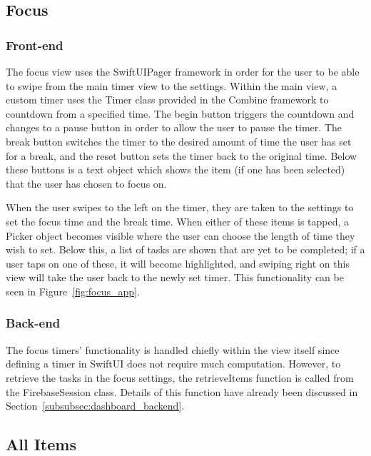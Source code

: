         \subsection{Focus}
        \subsubsection{Front-end}
        The focus view uses the SwiftUIPager framework in order for the user to be able to swipe from the main timer view to the settings.  Within the main view, a custom timer uses the Timer class provided in the Combine framework to countdown from a specified time.  The begin button triggers the countdown and changes to a pause button in order to allow the user to pause the timer.  The break button switches the timer to the desired amount of time the user has set for a break, and the reset button sets the timer back to the original time.  Below these buttons is a text object which shows the item (if one has been selected) that the user has chosen to focus on.
        
        When the user swipes to the left on the timer, they are taken to the settings to set the focus time and the break time.  When either of these items is tapped, a Picker object becomes visible where the user can choose the length of time they wish to set.  Below this, a list of tasks are shown that are yet to be completed; if a user taps on one of these, it will become highlighted, and swiping right on this view will take the user back to the newly set timer.  This functionality can be seen in Figure~\ref{fig:focus_app}.
        
        
        
        \subsubsection{Back-end}
        The focus timers' functionality is handled chiefly within the view itself since defining a timer in SwiftUI does not require much computation.  However, to retrieve the tasks in the focus settings, the retrieveItems function is called from the FirebaseSession class.  Details of this function have already been discussed in Section~\ref{subsubsec:dashboard_backend}.
        
        \subsection{All Items}

